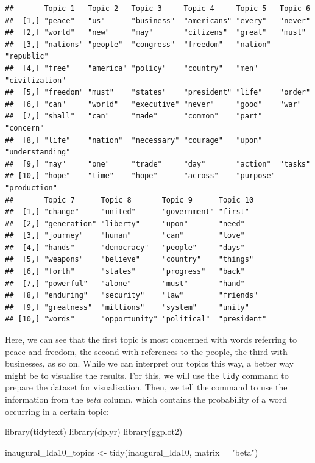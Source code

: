 \documentclass[
]{book}
\newenvironment{Shaded}{\begin{snugshade}}{\end{snugshade}}
\newcommand{\AttributeTok}[1]{\textcolor[rgb]{0.77,0.63,0.00}{#1}}
\newcommand{\FunctionTok}[1]{\textcolor[rgb]{0.00,0.00,0.00}{#1}}
\newcommand{\NormalTok}[1]{#1}
\newcommand{\OtherTok}[1]{\textcolor[rgb]{0.56,0.35,0.01}{#1}}
\newcommand{\StringTok}[1]{\textcolor[rgb]{0.31,0.60,0.02}{#1}}
\begin{document}
\begin{verbatim}
##       Topic 1   Topic 2   Topic 3     Topic 4     Topic 5   Topic 6        
##  [1,] "peace"   "us"      "business"  "americans" "every"   "never"        
##  [2,] "world"   "new"     "may"       "citizens"  "great"   "must"         
##  [3,] "nations" "people"  "congress"  "freedom"   "nation"  "republic"     
##  [4,] "free"    "america" "policy"    "country"   "men"     "civilization" 
##  [5,] "freedom" "must"    "states"    "president" "life"    "order"        
##  [6,] "can"     "world"   "executive" "never"     "good"    "war"          
##  [7,] "shall"   "can"     "made"      "common"    "part"    "concern"      
##  [8,] "life"    "nation"  "necessary" "courage"   "upon"    "understanding"
##  [9,] "may"     "one"     "trade"     "day"       "action"  "tasks"        
## [10,] "hope"    "time"    "hope"      "across"    "purpose" "production"   
##       Topic 7      Topic 8       Topic 9      Topic 10   
##  [1,] "change"     "united"      "government" "first"    
##  [2,] "generation" "liberty"     "upon"       "need"     
##  [3,] "journey"    "human"       "can"        "love"     
##  [4,] "hands"      "democracy"   "people"     "days"     
##  [5,] "weapons"    "believe"     "country"    "things"   
##  [6,] "forth"      "states"      "progress"   "back"     
##  [7,] "powerful"   "alone"       "must"       "hand"     
##  [8,] "enduring"   "security"    "law"        "friends"  
##  [9,] "greatness"  "millions"    "system"     "unity"    
## [10,] "words"      "opportunity" "political"  "president"
\end{verbatim}

Here, we can see that the first topic is most concerned with words referring to peace and freedom, the second with references to the people, the third with businesses, as so on. While we can interpret our topics this way, a better way might be to visualise the results. For this, we will use the \texttt{tidy} command to prepare the dataset for visualisation. Then, we tell the command to use the information from the \emph{beta} column, which contains the probability of a word occurring in a certain topic:

\begin{Shaded}
\begin{Highlighting}[]
\FunctionTok{library}\NormalTok{(tidytext)}
\FunctionTok{library}\NormalTok{(dplyr)}
\FunctionTok{library}\NormalTok{(ggplot2)}

\NormalTok{inaugural\_lda10\_topics }\OtherTok{\textless{}{-}} \FunctionTok{tidy}\NormalTok{(inaugural\_lda10, }\AttributeTok{matrix =} \StringTok{"beta"}\NormalTok{)}
\end{Highlighting}
\end{Shaded}
\end{document}
